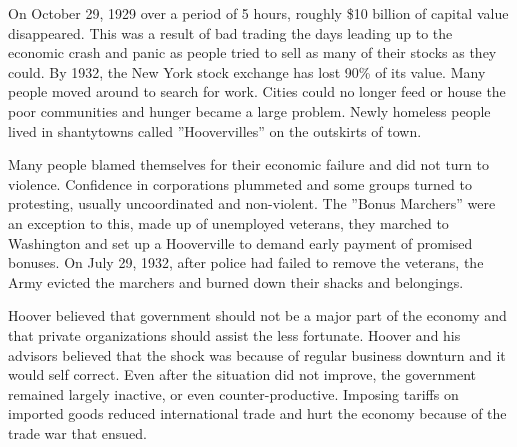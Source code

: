 On October 29, 1929 over a period of 5 hours, roughly \$10 billion of capital value disappeared.
This was a result of bad trading the days leading up to the economic crash and panic as people tried to sell as many of their stocks as they could.
By 1932, the New York stock exchange has lost 90\% of its value.
Many people moved around to search for work.
Cities could no longer feed or house the poor communities and hunger became a large problem.
Newly homeless people lived in shantytowns called ''Hoovervilles'' on the outskirts of town.

Many people blamed themselves for their economic failure and did not turn to violence.
Confidence in corporations plummeted and some groups turned to protesting, usually uncoordinated and non-violent.
The ''Bonus Marchers'' were an exception to this, made up of unemployed veterans, they marched to Washington and set up a Hooverville to demand early payment of promised bonuses.
On July 29, 1932, after police had failed to remove the veterans, the Army evicted the marchers and burned down their shacks and belongings.

Hoover believed that government should not be a major part of the economy and that private organizations should assist the less fortunate.
Hoover and his advisors believed that the shock was because of regular business downturn and it would self correct.
Even after the situation did not improve, the government remained largely inactive, or even counter-productive.
Imposing tariffs on imported goods reduced international trade and hurt the economy because of the trade war that ensued.